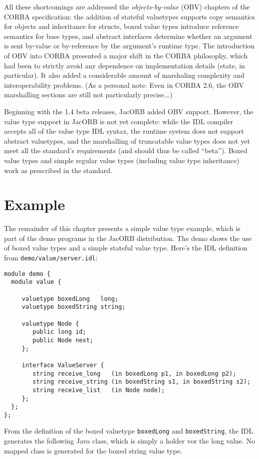 \documentclass[12pt]{scrbook}
\begin{document}
All these shortcomings are addressed the {\em objects-by-value} (OBV)
chapters of the CORBA specification: the addition of stateful
valuetypes supports copy semantics for objects and inheritance for
structs, boxed value types introduce reference semantics for base
types, and abstract interfaces determine whether an argument is sent
by-value or by-reference by the argument's runtime type. The
introduction of OBV into CORBA presented a major shift in the CORBA
philosophy, which had been to strictly avoid any dependence on
implementation details (state, in particular). It also added a
considerable amount of marshaling complexity and interoperability
problems. (As a personal note: Even in CORBA 2.6, the OBV marshalling
sections are still not particularly precise...)

Beginning with the 1.4 beta releases, JacORB added OBV support.
However, the value type support in JacORB is not yet complete: while
the IDL compiler accepts all of the value type IDL syntax, the runtime
system does not support abstract valuetypes, and the marshalling of
truncatable value types does not yet meet all the standard's
requirements (and should thus be called ``beta''). Boxed value types
and simple regular value types (including value type inheritance) work
as prescribed in the standard.

\section{Example}

The remainder of this chapter presents a simple value type example,
which is part of the demo programs in the JacORB distribution. The
demo shows the use of boxed value types and a simple stateful value
type. Here's the IDL definition from {\tt demo/value/server.idl}:

\begin{verbatim}
module demo {
  module value {

     valuetype boxedLong   long;
     valuetype boxedString string;

     valuetype Node {
        public long id;
        public Node next;
     };

     interface ValueServer {
        string receive_long   (in boxedLong p1, in boxedLong p2);
        string receive_string (in boxedString s1, in boxedString s2);
        string receive_list   (in Node node);
     };
  };
};
\end{verbatim}

From the definition of the  boxed valuetype {\tt boxedLong} and
{\tt boxedString}, the IDL generates the following Java class, which
is simply a holder vor the long value. No mapped class is generated
for the boxed string value type.
\end{document}
